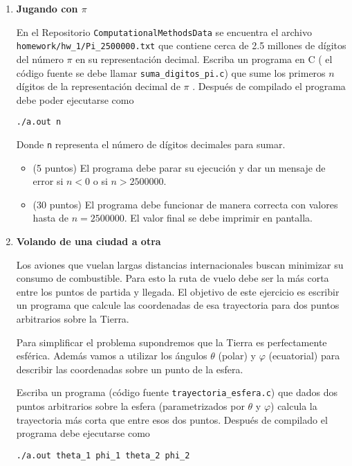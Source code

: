 \documentclass{article}
\begin{document}
\begin{enumerate}

\item {\bf Jugando con $\pi$} 

En el Repositorio \verb"ComputationalMethodsData" se encuentra el
archivo \verb"homework/hw_1/Pi_2500000.txt" que contiene cerca de 2.5
millones de d\'igitos del n\'umero $\pi$ en su representaci\'on
decimal. Escriba un programa en C ( el c\'odigo fuente se debe llamar
{\verb"suma_digitos_pi.c"}) que sume los primeros $n$ d\'igitos de la
representaci\'on decimal de $\pi$ . Despu\'es de compilado el programa
debe poder ejecutarse como  

\begin{verbatim}
./a.out n
\end{verbatim}
Donde \verb"n" representa el n\'umero de d\'igitos decimales para sumar. 
\begin{itemize}

\item (5 puntos) El programa debe parar su ejecuci\'on y dar un mensaje de error si $n<0$ o si $n>2500000$.
\item (30 puntos) El programa debe funcionar de manera correcta con valores hasta de $n=2500000$.  El valor final se debe imprimir en pantalla.
\end{itemize}



\item {\bf Volando de una ciudad a otra}

Los aviones que vuelan largas distancias internacionales buscan minimizar su consumo de combustible. Para esto la ruta de vuelo debe ser la m\'as corta entre los puntos de partida y llegada.  El objetivo de este ejercicio es escribir un programa que calcule las coordenadas de esa trayectoria para dos puntos arbitrarios sobre la Tierra.

Para simplificar el problema supondremos que la Tierra es perfectamente esf\'erica. Adem\'as vamos a utilizar los \'angulos $\theta$ (polar) y $\varphi$ (ecuatorial) para describir las coordenadas sobre un punto de la esfera.

Escriba un programa (c\'odigo fuente \verb"trayectoria_esfera.c") que dados dos puntos arbitrarios sobre la esfera (parametrizados por $\theta$ y $\varphi$) calcula la trayectoria m\'as corta que entre esos dos puntos. Despu\'es de compilado el programa debe ejecutarse como

\begin{verbatim}
./a.out theta_1 phi_1 theta_2 phi_2
\end{verbatim}


\end{enumerate}
\end{document}
